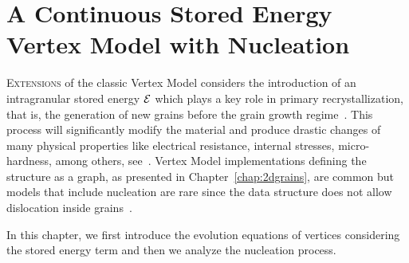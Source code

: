 \chapter{A Continuous Stored Energy Vertex Model with Nucleation}
\label{chap:storedenergy}

\lettrine{E}{xtensions} of the classic Vertex Model \cite{torres2015} considers the introduction of an intragranular stored energy $\mathcal{E}$ which plays a key role in primary recrystallization, that is, the generation of new grains before the grain growth regime~\cite{pikekos2008generalized, pikekos2008stochastic}.
This process will significantly modify the material and produce drastic changes of many physical properties like electrical resistance, internal stresses, micro-hardness, among others, see~\cite{pikekos2008generalized, pikekos2008stochastic}.
Vertex Model implementations defining the structure as a graph, as presented in Chapter~\ref{chap:2dgrains}, are common but models that include nucleation are rare since the data structure does not allow dislocation inside grains~\cite{Orend2015}.

In this chapter, we first introduce the evolution equations of vertices considering the stored energy term and then we analyze the nucleation process.

